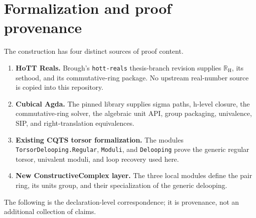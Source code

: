 \section{Formalization and proof provenance}
\label{sec:provenance}

The construction has four distinct sources of proof content.
\begin{enumerate}[label=\textbf{\arabic*.}]
\item \textbf{HoTT Reals.} Brough's \texttt{hott-reals} thesis-branch revision
supplies $\mathbb{R}_{\mathrm H}$, its sethood, and its commutative-ring
package.  No upstream real-number source is copied into this repository.
\item \textbf{Cubical Agda.} The pinned library supplies sigma paths, h-level
closure, the commutative-ring solver, the algebraic unit API, group packaging,
univalence, SIP, and right-translation equivalences.
\item \textbf{Existing CQTS torsor formalization.} The modules
\texttt{TorsorDelooping.Regular}, \texttt{Moduli}, and \texttt{Delooping}
prove the generic regular torsor, univalent moduli, and loop recovery used
here.
\item \textbf{New ConstructiveComplex layer.} The three local modules define
the pair ring, its units group, and their specialization of the generic
delooping.
\end{enumerate}

The following is the declaration-level correspondence; it is provenance, not
an additional collection of claims.

